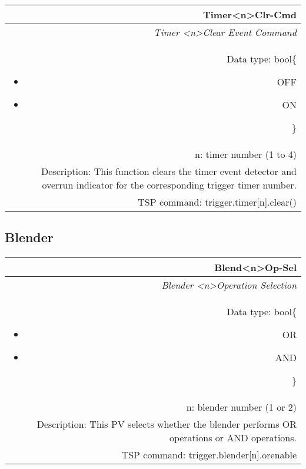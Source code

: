 \documentclass[openany]{article}
\begin{document}
		\begin{tabular}{N}
			\hline
			\bfseries Timer{\textless n\textgreater}Clr-Cmd\label{pv:timerclr-cmd} \\ \hline
			\emph{Timer \textless n\textgreater Clear Event Command} \\
			Data type: bool\{\begin{itemize}[noitemsep]
				\small
				\item[] OFF
				\item[] ON
			\end{itemize}\} \\
			n: timer number (1 to 4) \\
			Description: This function clears the timer event detector and overrun indicator for the corresponding trigger timer number. \\
			TSP command: trigger.timer[n].clear()
		\end{tabular}

	\subsection{Blender}\label{pvgroup:blender}

		\paragraph{} %

		\begin{tabular}{N}
			\hline
			\bfseries Blend{\textless n\textgreater}Op-Sel\label{pv:blendop-sel} \\ \hline
			\emph{Blender \textless n\textgreater Operation Selection} \\
			Data type: bool\{\begin{itemize}[noitemsep]
				\small
				\item[] OR
				\item[] AND
			\end{itemize}\} \\
			n: blender number (1 or 2) \\
			Description: This PV selects whether the blender performs OR operations or AND operations. \\
			TSP command: trigger.blender[n].orenable
		\end{tabular}
\end{document}
